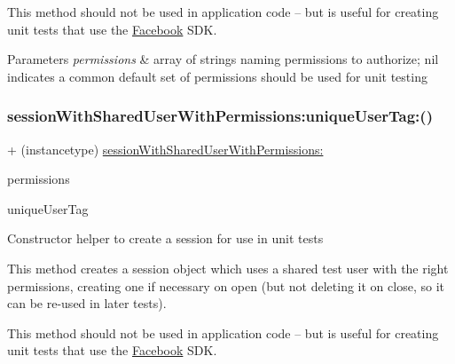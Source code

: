 This method should not be used in application code -- but is useful for creating unit tests that use the \hyperlink{interfaceFacebook}{Facebook} S\+DK.


\begin{DoxyParams}{Parameters}
{\em permissions} & array of strings naming permissions to authorize; nil indicates a common default set of permissions should be used for unit testing \\
\hline
\end{DoxyParams}
\mbox{\label{interfaceFBTestSession_aeee103e1f8eecc2e67381736a0f36a5d}} 
\subsubsection{\texorpdfstring{session\+With\+Shared\+User\+With\+Permissions\+:unique\+User\+Tag\+:()}{sessionWithSharedUserWithPermissions:uniqueUserTag:()}\hspace{0.1cm}{\footnotesize\ttfamily [1/5]}}
{\footnotesize\ttfamily + (instancetype) \hyperlink{interfaceFBTestSession_a27f8f36ddb23ea218117bc2e927d8039}{session\+With\+Shared\+User\+With\+Permissions\+:} \begin{DoxyParamCaption}\item[{(N\+S\+Array $\ast$)}]{permissions }\item[{uniqueUserTag:(N\+S\+String $\ast$)}]{unique\+User\+Tag }\end{DoxyParamCaption}}

Constructor helper to create a session for use in unit tests

This method creates a session object which uses a shared test user with the right permissions, creating one if necessary on open (but not deleting it on close, so it can be re-\/used in later tests).

This method should not be used in application code -- but is useful for creating unit tests that use the \hyperlink{interfaceFacebook}{Facebook} S\+DK.


